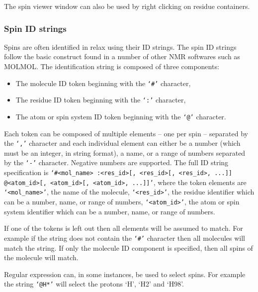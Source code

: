 The spin viewer window can also be used by right clicking on residue containers.



\subsubsection{Spin ID strings} \label{sect: spin ID}

Spins are often identified in relax using their ID strings.  The spin ID strings follow the basic construct found in a number of other NMR softwares such as MOLMOL.  The identification string is composed of three components:

\begin{itemize}
\item The molecule ID token beginning with the \texttt{`\#'} character,
\item The residue ID token beginning with the \texttt{`:'} character,
\item The atom or spin system ID token beginning with the \texttt{`@'} character.
\end{itemize}

Each token can be composed of multiple elements -- one per spin -- separated by the \texttt{`,'} character and each individual element can either be a number (which must be an integer, in string format), a name, or a range of numbers separated by the \texttt{`-'} character.  Negative numbers are supported.  The full ID string specification is \texttt{`\#<mol\_name> :<res\_id>[, <res\_id>[, <res\_id>, ...]] @<atom\_id>[, <atom\_id>[, <atom\_id>, ...]]'}, where the token elements are \texttt{`<mol\_name>'}, the name of the molecule, \texttt{`<res\_id>'}, the residue identifier which can be a number, name, or range of numbers, \texttt{`<atom\_id>'}, the atom or spin system identifier which can be a number, name, or range of numbers.

If one of the tokens is left out then all elements will be assumed to match.  For example if the string does not contain the \texttt{`\#'} character then all molecules will match the string.  If only the molecule ID component is specified, then all spins of the molecule will match.

Regular expression can, in some instances, be used to select spins.  For example the string \texttt{`@H*'} will select the protons `H', `H2' and `H98'.




